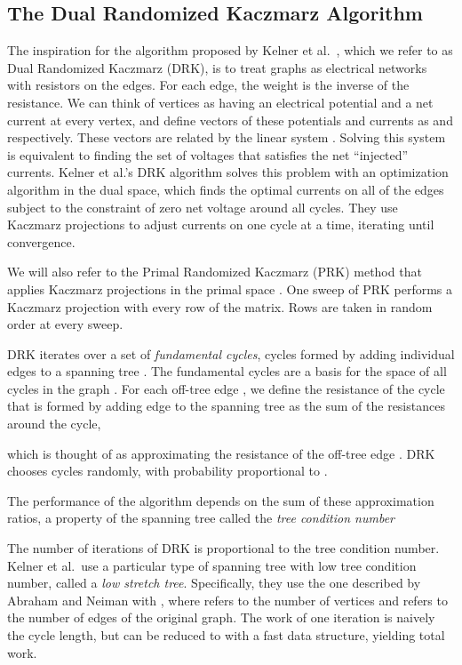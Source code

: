 \documentclass{sig-alternate}
\begin{document}
\subsection{The Dual Randomized Kaczmarz Algorithm}
The inspiration for the algorithm
proposed by Kelner et al.\ \cite{KOSZ2013},
which we refer to as Dual Randomized Kaczmarz (DRK),
is to treat graphs as electrical
networks with resistors on the edges.
For each edge, the weight is the inverse of the
resistance. We can think of vertices as having an electrical potential
and a net
current at every vertex, and define vectors of these potentials and currents as
 and  respectively. These vectors are related by the
linear
system . Solving this system is equivalent to finding
the set of voltages that satisfies the net ``injected'' currents.
Kelner et al.'s DRK
algorithm solves this problem with an optimization algorithm in the dual space,
which finds the optimal currents on all of the edges subject to the constraint
of zero net voltage around all cycles. They use Kaczmarz projections
\cite{Kaczmarz1937} to adjust currents on one cycle at a time,
iterating until convergence.

We will also refer to the
Primal Randomized Kaczmarz (PRK) method that applies Kaczmarz projections
in the primal space \cite{StrohmerVershynin2009}. One sweep of PRK performs
a Kaczmarz projection with every row of the matrix. Rows are taken in random
order at every sweep.

DRK iterates over a set of \textit{fundamental cycles},
cycles formed by adding
individual edges to a spanning tree .
The fundamental cycles are a basis for the space of all cycles in the graph
\cite{Diestel2010}.
For each off-tree edge , we define
the resistance  of the cycle  that is
formed by adding edge  to the spanning tree
as the sum of the
resistances around the cycle,

which is thought of as approximating the
resistance of the off-tree edge . DRK
chooses cycles randomly,
with probability proportional to .

The performance of the algorithm depends on the sum of
these approximation ratios, a property of the spanning tree
called the \textit{tree condition number}

The number of iterations of DRK is proportional to the
tree condition number.
Kelner et al.\ use
a particular type of spanning tree with low tree condition
number, called a \textit{low stretch tree}. Specifically, they
use the
one described by Abraham and Neiman \cite{AbrahamNeiman2012}
with , where  refers
to the number of vertices and  refers to the number of edges
of the original graph.
The work of one iteration is naively the cycle length, but
can be reduced to  with a fast data structure,
yielding  total work.
\end{document}
